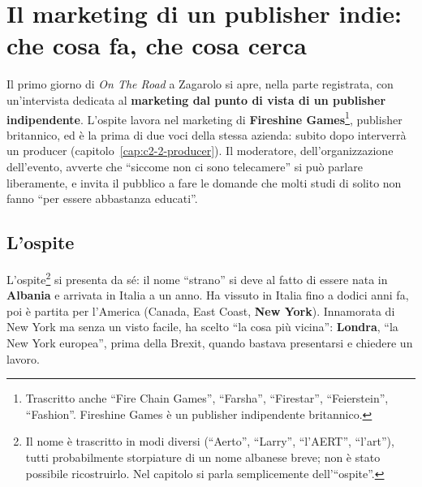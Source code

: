 
\chapter[Il marketing di un publisher indie]{Il marketing di un publisher
indie: che cosa fa, che cosa cerca}
\label{cap:c2-1-marketing-publisher}

Il primo giorno di \emph{On The Road} a Zagarolo si apre, nella parte registrata,
con un'intervista dedicata al \textbf{marketing dal punto di vista di un publisher
indipendente}. L'ospite lavora nel marketing di \textbf{Fireshine
Games}\footnote{Trascritto anche ``Fire Chain Games'', ``Farsha'', ``Firestar'',
``Feierstein'', ``Fashion''. Fireshine Games è un publisher indipendente
britannico.}, publisher britannico, ed è la prima di due voci della stessa
azienda: subito dopo interverrà un producer (capitolo~\ref{cap:c2-2-producer}).
Il moderatore, dell'organizzazione dell'evento, avverte che ``siccome non ci sono
telecamere'' si può parlare liberamente, e invita il pubblico a fare le domande
che molti studi di solito non fanno ``per essere abbastanza educati''.

\section{L'ospite}
\label{sec:c2-1-ospite}

L'ospite\footnote{Il nome è trascritto in modi diversi (``Aerto'', ``Larry'',
``l'AERT'', ``l'art''), tutti probabilmente storpiature di un nome albanese
breve; non è stato possibile ricostruirlo. Nel capitolo si parla semplicemente
dell'``ospite''.} si presenta da sé: il nome ``strano'' si deve al fatto di essere
nata in \textbf{Albania} e arrivata in Italia a un anno. Ha vissuto in Italia fino
a dodici anni fa, poi è partita per l'America (Canada, East Coast, \textbf{New
York}). Innamorata di New York ma senza un visto facile, ha scelto ``la cosa più
vicina'': \textbf{Londra}, ``la New York europea'', prima della Brexit, quando
bastava presentarsi e chiedere un lavoro.

